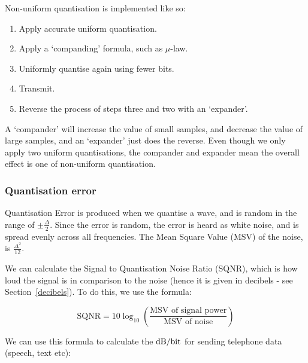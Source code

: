 \begin{description}
  Non-uniform quantisation is implemented like so:

  \begin{enumerate}
    \item Apply accurate uniform quantisation.
    \item Apply a `companding' formula, such as $\mu$-law.
    \item Uniformly quantise again using fewer bits.
    \item Transmit.
    \item Reverse the process of steps three and two with an `expander'.
  \end{enumerate}


  A `compander' will increase the value of small samples, and decrease the
  value of large samples, and an `expander' just does the reverse. Even though
  we only apply two uniform quantisations, the compander and expander mean the
  overall effect is one of non-uniform quantisation.


\end{description}

\subsubsection{Quantisation error}

Quantisation Error is produced when we quantise a wave, and is random in the
range of $\pm\frac{\Delta}{2}$. Since the error is random, the error is heard as
white noise, and is spread evenly across all frequencies. The Mean Square Value
(MSV) of the noise, is $\frac{\Delta^2}{12}$.

We can calculate the Signal to Quantisation Noise Ratio (SQNR), which is how
loud the signal is in comparison to the noise (hence it is given in decibels -
see Section~\ref{decibels}). To do this, we use the formula:

\[
  \text{SQNR} = 10\log_{10}\left(\frac{\text{MSV of signal power}}{\text{MSV of noise}}\right)
\]

\newpage

We can use this formula to calculate the $\si{\decibel\per\bit}$ for sending
telephone data (speech, text etc):

